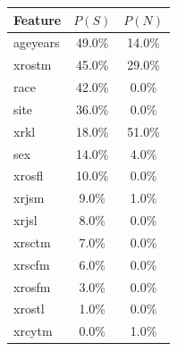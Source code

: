 \begin{tabular}{lcc}\toprule
Feature & $P(S)$ & $P(N)$\\\midrule
ageyears & 49.0\% & 14.0\%\\
xrostm & 45.0\% & 29.0\%\\
race & 42.0\% & 0.0\%\\
site & 36.0\% & 0.0\%\\
xrkl & 18.0\% & 51.0\%\\
sex & 14.0\% & 4.0\%\\
xrosfl & 10.0\% & 0.0\%\\
xrjsm & 9.0\% & 1.0\%\\
xrjsl & 8.0\% & 0.0\%\\
xrsctm & 7.0\% & 0.0\%\\
xrscfm & 6.0\% & 0.0\%\\
xrosfm & 3.0\% & 0.0\%\\
xrostl & 1.0\% & 0.0\%\\
xrcytm & 0.0\% & 1.0\%\\\bottomrule\end{tabular}